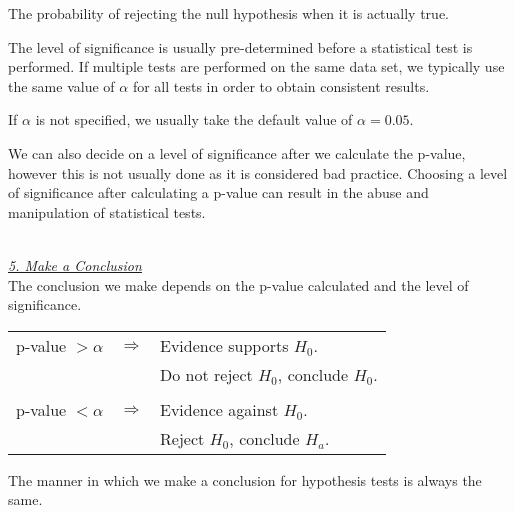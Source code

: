 \begin{definition}	
The probability of rejecting the null hypothesis when it is actually true.
\end{definition}

The level of significance is usually pre-determined before a 
statistical test is performed. If multiple tests are performed on the same data set, we typically use the same value of $\alpha$ for all tests in order to obtain consistent results.

\begin{nt}
If $\alpha$ is not specified, we usually take the default value of $\alpha = 0.05$.
\end{nt}

We can also decide on a level of significance after we calculate the 
p-value, however this is not usually done as it is considered bad practice. Choosing a level of significance after calculating a p-value can result in the abuse and manipulation of statistical tests.


\hfill\\
\noindent
{\em \underline{5. Make a Conclusion} }\\

\noindent
The conclusion we make depends on the p-value calculated and the level of significance.

\begin{rules}
\label{ruleConclusionHypTest}

\begin{tabular}{lcl}
p-value $> \alpha$	&	$\Longrightarrow$	& 	Evidence supports $H_{0}$.				\\
				&					&	Do not reject $H_{0}$, conclude $H_{0}$.		\\
\hfill\\
p-value $< \alpha$	&	$\Longrightarrow$	& 	Evidence against $H_{0}$.				\\
				&					&	Reject $H_{0}$, conclude $H_{a}$.			\\
\end{tabular}
\end{rules}

\noindent
The manner in which we make a conclusion for hypothesis tests
is always the same.

